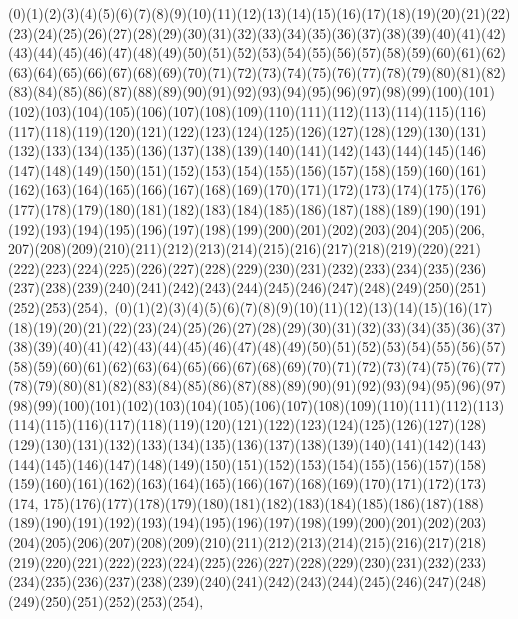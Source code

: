 \documentclass[12pt]{article}
\begin{document}
{(0)(1)(2)(3)(4)(5)(6)(7)(8)(9)(10)(11)(12)(13)(14)(15)(16)(17)(18)(19)(20)(21)(22)(23)(24)(25)(26)(27)(28)(29)(30)(31)(32)(33)(34)(35)(36)(37)(38)(39)(40)(41)(42)(43)(44)(45)(46)(47)(48)(49)(50)(51)(52)(53)(54)(55)(56)(57)(58)(59)(60)(61)(62)(63)(64)(65)(66)(67)(68)(69)(70)(71)(72)(73)(74)(75)(76)(77)(78)(79)(80)(81)(82)(83)(84)(85)(86)(87)(88)(89)(90)(91)(92)(93)(94)(95)(96)(97)(98)(99)(100)(101)(102)(103)(104)(105)(106)(107)(108)(109)(110)(111)(112)(113)(114)(115)(116)(117)(118)(119)(120)(121)(122)(123)(124)(125)(126)(127)(128)(129)(130)(131)(132)(133)(134)(135)(136)(137)(138)(139)(140)(141)(142)(143)(144)(145)(146)(147)(148)(149)(150)(151)(152)(153)(154)(155)(156)(157)(158)(159)(160)(161)(162)(163)(164)(165)(166)(167)(168)(169)(170)(171)(172)(173)(174)(175)(176)(177)(178)(179)(180)(181)(182)(183)(184)(185)(186)(187)(188)(189)(190)(191)(192)(193)(194)(195)(196)(197)(198)(199)(200)(201)(202)(203)(204)(205)(206, 207)(208)(209)(210)(211)(212)(213)(214)(215)(216)(217)(218)(219)(220)(221)(222)(223)(224)(225)(226)(227)(228)(229)(230)(231)(232)(233)(234)(235)(236)(237)(238)(239)(240)(241)(242)(243)(244)(245)(246)(247)(248)(249)(250)(251)(252)(253)(254)$
, 
$
(0)(1)(2)(3)(4)(5)(6)(7)(8)(9)(10)(11)(12)(13)(14)(15)(16)(17)(18)(19)(20)(21)(22)(23)(24)(25)(26)(27)(28)(29)(30)(31)(32)(33)(34)(35)(36)(37)(38)(39)(40)(41)(42)(43)(44)(45)(46)(47)(48)(49)(50)(51)(52)(53)(54)(55)(56)(57)(58)(59)(60)(61)(62)(63)(64)(65)(66)(67)(68)(69)(70)(71)(72)(73)(74)(75)(76)(77)(78)(79)(80)(81)(82)(83)(84)(85)(86)(87)(88)(89)(90)(91)(92)(93)(94)(95)(96)(97)(98)(99)(100)(101)(102)(103)(104)(105)(106)(107)(108)(109)(110)(111)(112)(113)(114)(115)(116)(117)(118)(119)(120)(121)(122)(123)(124)(125)(126)(127)(128)(129)(130)(131)(132)(133)(134)(135)(136)(137)(138)(139)(140)(141)(142)(143)(144)(145)(146)(147)(148)(149)(150)(151)(152)(153)(154)(155)(156)(157)(158)(159)(160)(161)(162)(163)(164)(165)(166)(167)(168)(169)(170)(171)(172)(173)(174, 175)(176)(177)(178)(179)(180)(181)(182)(183)(184)(185)(186)(187)(188)(189)(190)(191)(192)(193)(194)(195)(196)(197)(198)(199)(200)(201)(202)(203)(204)(205)(206)(207)(208)(209)(210)(211)(212)(213)(214)(215)(216)(217)(218)(219)(220)(221)(222)(223)(224)(225)(226)(227)(228)(229)(230)(231)(232)(233)(234)(235)(236)(237)(238)(239)(240)(241)(242)(243)(244)(245)(246)(247)(248)(249)(250)(251)(252)(253)(254)$
, 
$
}
\end{document}
